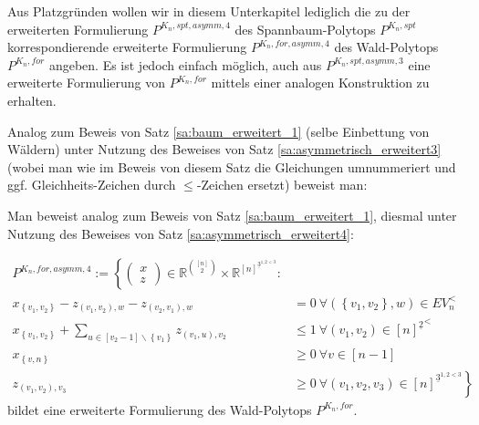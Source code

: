 \documentclass[10p,a4paper,BCOR = 12mm, DIV=15]{scrbook}
\begin{document}
{Aus Platzgründen wollen wir in diesem Unterkapitel lediglich die zu der erweiterten Formulierung $P^{K_n, spt, asymm, 4}$ des Spannbaum-Polytops $P^{K_n, spt}$ korrespondierende erweiterte Formulierung $P^{K_n, for, asymm, 4}$ des Wald-Polytops $P^{K_n, for}$ angeben. Es ist jedoch einfach möglich, auch aus $P^{K_n, spt, asymm, 3}$ eine erweiterte Formulierung von  $P^{K_n, for}$ mittels einer analogen Konstruktion zu erhalten. 

Analog zum Beweis von Satz \ref{sa:baum_erweitert_1} (selbe Einbettung von Wäldern) unter Nutzung des Beweises von Satz \ref{sa:asymmetrisch_erweitert3} (wobei man wie im Beweis von diesem Satz die Gleichungen umnummeriert und ggf. Gleichheits-Zeichen durch $\leq$-Zeichen ersetzt) beweist man:

Man beweist analog zum Beweis von Satz \ref{sa:baum_erweitert_1}, diesmal unter Nutzung des Beweises von Satz \ref{sa:asymmetrisch_erweitert4}:

\begin{Sa}
\label{sa:asymmetrisch_erweitert4_baum}
\begin{align}
P^{K_n, for, asymm, 4} := \left\{
\left(\begin{array}{c}
x \\
z
\end{array}\right)\in \mathbb{R}^{[n]\choose 2} \times \mathbb{R}^{\left[n\right]^{\underline{3}^{1, 2<3}}}: \nonumber\right. \\
x_{\left\{v_1, v_2\right\}} - z_{\left(v_1, v_2\right), w} - z_{\left(v_2, v_1\right), w} & = 0\ \forall \left(\left\{v_1, v_2\right\}, w\right)\in EV_n^< \label{eq:forest_erweitert_asymm4_prim_1} \\
x_{\left\{v_1, v_2\right\}} + \sum_{u\in[v_2-1]\backslash\left\{v_1\right\}} z_{\left(v_1, u\right), v_2} & \leq 1\ \forall \left(v_1, v_2\right)\in {[n]^{\underline{2}}}^< \label{eq:forest_erweitert_asymm4_prim_2}  \\
x_{\left\{v, n\right\}} & \geq 0 \ \forall v\in \left[n-1\right] \label{eq:forest_erweitert_asymm4_x_n} \\
z_{\left(v_1, v_2\right), v_3} & \left. \geq 0 \ \forall \left(v_1, v_2, v_3\right)\in \left[n\right]^{\underline{3}^{1, 2<3}} \label{eq:forest_erweitert_asymm4_z} \right\}
\end{align}
bildet eine erweiterte Formulierung des Wald-Polytops $P^{K_n, for}$.
\end{Sa}

}
\end{document}
